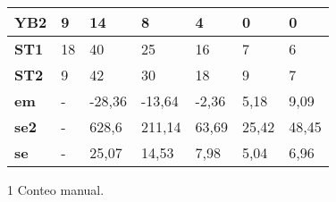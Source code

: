 \begin{table}[]
\begin{threeparttable}[b]
\begin{tabular}{l|l|lllll|}
            \multicolumn{1}{|l|}{\textbf{YB2}}   & 9           & \multicolumn{1}{l|}{14}     & \multicolumn{1}{l|}{8}      & \multicolumn{1}{l|}{4}     & \multicolumn{1}{l|}{0}     & 0     \\ \hline
            \multicolumn{1}{|l|}{\textbf{ST1}}   & 18          & \multicolumn{1}{l|}{40}     & \multicolumn{1}{l|}{25}     & \multicolumn{1}{l|}{16}    & \multicolumn{1}{l|}{7}     & 6     \\ \hline
            \multicolumn{1}{|l|}{\textbf{ST2}}   & 9           & \multicolumn{1}{l|}{42}     & \multicolumn{1}{l|}{30}     & \multicolumn{1}{l|}{18}    & \multicolumn{1}{l|}{9}     & 7     \\ \hline
            \multicolumn{1}{|l|}{\textbf{em}}    & -           & \multicolumn{1}{l|}{-28,36} & \multicolumn{1}{l|}{-13,64} & \multicolumn{1}{l|}{-2,36} & \multicolumn{1}{l|}{5,18}  & 9,09  \\ \hline
            \multicolumn{1}{|l|}{\textbf{se2}}   & -           & \multicolumn{1}{l|}{628,6}  & \multicolumn{1}{l|}{211,14} & \multicolumn{1}{l|}{63,69} & \multicolumn{1}{l|}{25,42} & 48,45 \\ \hline
            \multicolumn{1}{|l|}{\textbf{se}}    & -           & \multicolumn{1}{l|}{25,07}  & \multicolumn{1}{l|}{14,53}  & \multicolumn{1}{l|}{7,98}  & \multicolumn{1}{l|}{5,04}  & 6,96  \\ \hline
        \end{tabular}
        \begin{tablenotes}
       \item [1]Conteo manual.
     \end{tablenotes}
  \end{threeparttable}
\end{table}